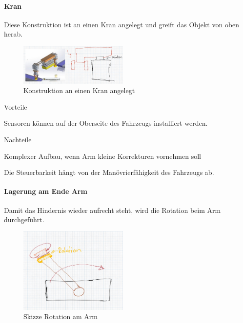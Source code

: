 \documentclass[../main.tex]{subfiles}
\begin{document}
\paragraph{Kran}
Diese Konstruktion ist an einen Kran angelegt und greift das Objekt von oben herab.

\begin{figure}[H]
        \centering
        \includegraphics[width=0.48\textwidth]{img/technologierecherche/Rotation/seitlich_mit_rotation.jpg}
        \caption[Konstruktion an einen Kran angelehnt]{Konstruktion an einen Kran angelegt \footnotemark} 
        \label{img:tech_seitlich_mit_rotation}
\end{figure}

\begin{minipage}[t]{0.48\textwidth}
    \begin{items}
          \item [Vorteile]
           \item Sensoren können auf der Oberseite des Fahrzeugs installiert werden.
    \end{items}
\end{minipage}
\hfill
\begin{minipage}[t]{0.48\textwidth}
    \begin{items}
          \item [Nachteile]
          \item Komplexer Aufbau, wenn Arm kleine Korrekturen vornehmen soll
          \item Die Steuerbarkeit hängt von der Manövrierfähigkeit des Fahrzeugs ab.
    \end{items}
\end{minipage}
\newpage
\paragraph{Lagerung am Ende Arm}
Damit das Hindernis wieder aufrecht steht, wird die Rotation beim Arm durchgeführt. 

\begin{figure}[H]
        \centering
        \includegraphics[width=0.48\textwidth]{img/technologierecherche/Rotation/ueberkopf_griff_gelagert.jpg}
        \caption{Skizze Rotation am Arm}
        \label{img:tech_ueberkopf_griff_gelagert}
\end{figure}
\end{document}
